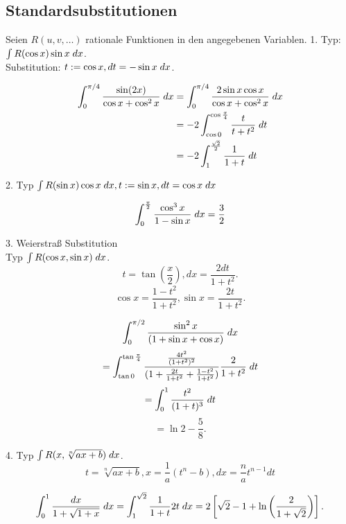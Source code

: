 \documentclass[../ana2u.tex]{subfiles}
\begin{document}
\subsection*{Standardsubstitutionen}
Seien \( R(u,v,\dots) \) rationale 
Funktionen in den angegebenen Variablen.
1. Typ: \( \int R(\cos x) \sin x \dx \).\\
Substitution: \( t := \cos x, dt = -\sin x \dx \).
\begin{bsp}
    \begin{align*}
        \integral{\frac{\sin(2x)}{\cos x 
        + \cos^2 x}}{0}{\pi/4} 
        &= \integral{\frac{2\sin x \cos x}{\cos x + \cos^2 x}}{0}{\pi/4} \\
        &= -2 \integralx{\frac{t}{t+t^2}}{\cos 0}{\cos \frac{\pi}{4}}{t} \\
        &= -2 \integralx{\frac{1}{1+t}}{1}{\frac{\sqrt{2}}{2}}{t}
    \end{align*}
\end{bsp}
2. Typ \( \int R(\sin x) \cos x \dx, t := \sin x, dt = \cos x \dx \)
\begin{bsp}
    \[ \integral{\frac{\cos^3 x}{1 -\sin x}}{0}{\frac{\pi}{2}} = \frac{3}{2} \]
\end{bsp}
3. Weierstraß Substitution\\
Typ \( \int R(\cos x, \sin x) \dx \).
\[ t = \tan(\frac{x}{2}), dx = \frac{2dt}{1 + t^2}. \]
\[ \cos x = \frac{1 - t^2}{1 + t^2}, 
\sin x = \frac{2t}{1 + t^2}. \]
\begin{bsp}
    \[ \integral{\frac{\sin^2 x}{(1 + \sin x + \cos x)}}{0}{\pi/2} \]
    \[ = \integralx{ \frac{ \frac{4t^2}{(1+t^2)^2} }{ 
        (1 + \frac{2t}{1+t^2} + \frac{1-t^2}{1+t^2})
     } \frac{2}{1+t^2} }{\tan 0}{\tan \frac{\pi}{4}}{t} \]
    \[ = \integralx{\frac{t^2}{(1+t)^3}}{0}{1}{t} \]
    \[ = \ln 2 - \frac{5}{8}. \]
\end{bsp}
4. Typ \( \int R(x, \sqrt[n]{ax + b}) \dx \).
\[ t = \sqrt[n]{ax+b}, x = \frac{1}{a} (t^n - b), 
dx = \frac{n}{a} t^{n-1} dt \]
\begin{bsp}
    \[ \integral{\frac{dx}{1+\sqrt{1+x}}}{0}{1}
    = \integral{\frac{1}{1+t} 2t}{1}{\sqrt{2}} 
    = 2 \left[ \sqrt{2} - 1 
    + \ln \left( \frac{2}{1+\sqrt{2}} \right) \right]. \]   
\end{bsp}
\end{document}

